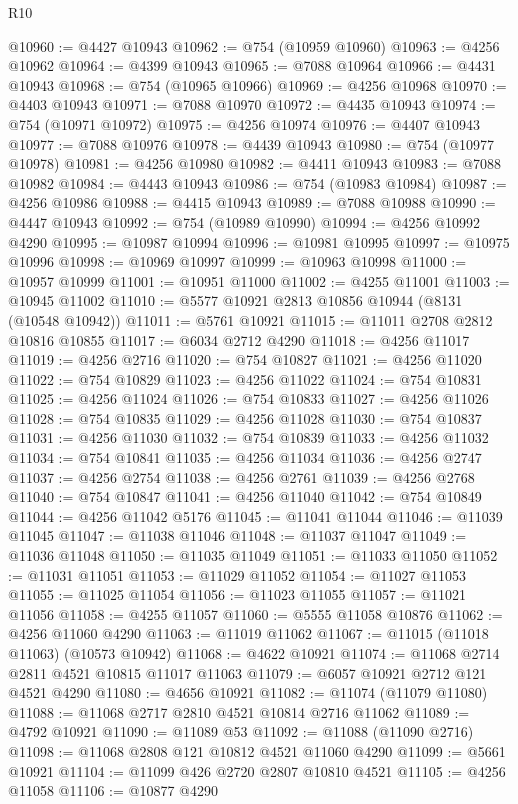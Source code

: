 \begin{lexlean}{R10}
\begin{coremodule}
@10960 := @4427 @10943
@10962 := @754 (@10959 @10960)
@10963 := @4256 @10962
@10964 := @4399 @10943
@10965 := @7088 @10964
@10966 := @4431 @10943
@10968 := @754 (@10965 @10966)
@10969 := @4256 @10968
@10970 := @4403 @10943
@10971 := @7088 @10970
@10972 := @4435 @10943
@10974 := @754 (@10971 @10972)
@10975 := @4256 @10974
@10976 := @4407 @10943
@10977 := @7088 @10976
@10978 := @4439 @10943
@10980 := @754 (@10977 @10978)
@10981 := @4256 @10980
@10982 := @4411 @10943
@10983 := @7088 @10982
@10984 := @4443 @10943
@10986 := @754 (@10983 @10984)
@10987 := @4256 @10986
@10988 := @4415 @10943
@10989 := @7088 @10988
@10990 := @4447 @10943
@10992 := @754 (@10989 @10990)
@10994 := @4256 @10992 @4290
@10995 := @10987 @10994
@10996 := @10981 @10995
@10997 := @10975 @10996
@10998 := @10969 @10997
@10999 := @10963 @10998
@11000 := @10957 @10999
@11001 := @10951 @11000
@11002 := @4255 @11001
@11003 := @10945 @11002
@11010 := @5577 @10921 @2813 @10856 @10944 (@8131 (@10548 @10942))
@11011 := @5761 @10921
@11015 := @11011 @2708 @2812 @10816 @10855
@11017 := @6034 @2712 @4290
@11018 := @4256 @11017
@11019 := @4256 @2716
@11020 := @754 @10827
@11021 := @4256 @11020
@11022 := @754 @10829
@11023 := @4256 @11022
@11024 := @754 @10831
@11025 := @4256 @11024
@11026 := @754 @10833
@11027 := @4256 @11026
@11028 := @754 @10835
@11029 := @4256 @11028
@11030 := @754 @10837
@11031 := @4256 @11030
@11032 := @754 @10839
@11033 := @4256 @11032
@11034 := @754 @10841
@11035 := @4256 @11034
@11036 := @4256 @2747
@11037 := @4256 @2754
@11038 := @4256 @2761
@11039 := @4256 @2768
@11040 := @754 @10847
@11041 := @4256 @11040
@11042 := @754 @10849
@11044 := @4256 @11042 @5176
@11045 := @11041 @11044
@11046 := @11039 @11045
@11047 := @11038 @11046
@11048 := @11037 @11047
@11049 := @11036 @11048
@11050 := @11035 @11049
@11051 := @11033 @11050
@11052 := @11031 @11051
@11053 := @11029 @11052
@11054 := @11027 @11053
@11055 := @11025 @11054
@11056 := @11023 @11055
@11057 := @11021 @11056
@11058 := @4255 @11057
@11060 := @5555 @11058 @10876
@11062 := @4256 @11060 @4290
@11063 := @11019 @11062
@11067 := @11015 (@11018 @11063) (@10573 @10942)
@11068 := @4622 @10921
@11074 := @11068 @2714 @2811 @4521 @10815 @11017 @11063
@11079 := @6057 @10921 @2712 @121 @4521 @4290
@11080 := @4656 @10921
@11082 := @11074 (@11079 @11080)
@11088 := @11068 @2717 @2810 @4521 @10814 @2716 @11062
@11089 := @4792 @10921
@11090 := @11089 @53
@11092 := @11088 (@11090 @2716)
@11098 := @11068 @2808 @121 @10812 @4521 @11060 @4290
@11099 := @5661 @10921
@11104 := @11099 @426 @2720 @2807 @10810 @4521
@11105 := @4256 @11058
@11106 := @10877 @4290

\end{coremodule}
\end{lexlean}
